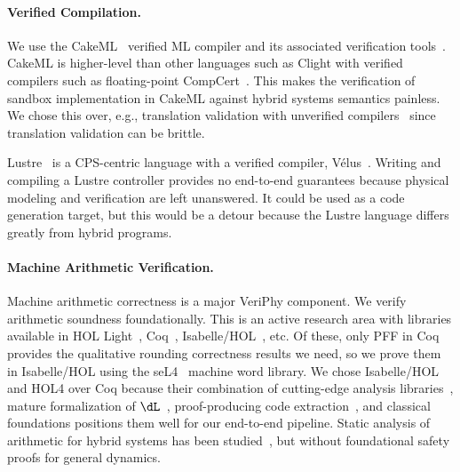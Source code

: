 \documentclass[12pt]{cmuthesis}
\theoremstyle{definition}
\theoremstyle{remark}
\newcommand{\Isabelle}{Isabelle/HOL\xspace}
\newcommand{\VeriPhy}{VeriPhy\xspace}
\begin{document}
\paragraph{Verified Compilation.}
We use the CakeML~\cite{DBLP:conf/icfp/TanMKFON16} verified ML compiler and its associated verification tools~\cite{DBLP:conf/icfp/MyreenO12,DBLP:conf/esop/GueneauMKN17}.
CakeML is higher-level than other languages such as Clight with verified compilers such as floating-point CompCert~\cite{DBLP:conf/arith/BoldoJLM13}.
This makes the verification of sandbox implementation in CakeML against hybrid systems semantics painless.
We chose this over, e.g., translation validation with unverified compilers~\cite{DBLP:conf/pldi/SewellMK13} since translation validation can be brittle.

Lustre~\cite{DBLP:journals/tse/HalbwachsLR92} is a CPS-centric language with a verified compiler, V\'{e}lus~\cite{DBLP:conf/pldi/BourkeBDLPR17}.
Writing and compiling a Lustre controller provides no end-to-end guarantees because physical modeling and verification are left unanswered.
It could be used as a code generation target, but this would be a detour because the Lustre language differs greatly from hybrid programs.

\paragraph{Machine Arithmetic Verification.}
Machine arithmetic correctness is a major \VeriPhy component.
We verify arithmetic soundness foundationally.
This is an active research area with libraries available in HOL Light~\cite{DBLP:conf/sfm/Harrison06}, Coq~\cite{DBLP:conf/arith/BoldoM10,DBLP:conf/tphol/DaumasRT01,DBLP:conf/mkm/BoldoFM09,DBLP:journals/iandc/Melquiond12}, \Isabelle~\cite{DBLP:journals/afp/Yu13}, etc.
Of these, only PFF in Coq~\cite{DBLP:conf/tphol/DaumasRT01} provides the qualitative rounding correctness results we need, so we prove them in \Isabelle using the seL4~\cite{DBLP:journals/cacm/KleinAEHCDEEKNSTW10} machine word library.
We chose \Isabelle and HOL4 over Coq because their combination of cutting-edge analysis libraries~\cite{DBLP:conf/itp/ImmlerT16}, mature formalization of $\dL$~\cite{DBLP:conf/cpp/BohrerRVVP17}, proof-producing code extraction~\cite{DBLP:conf/icfp/MyreenO12}, and classical foundations positions them well for our end-to-end pipeline.
Static analysis of arithmetic for hybrid systems has been studied~\cite{DBLP:conf/emsoft/MartinezMST10,DBLP:conf/emsoft/MajumdarSZ12,DBLP:conf/cav/BouissouGPTV09}, but without foundational safety proofs for general dynamics.
\end{document}
